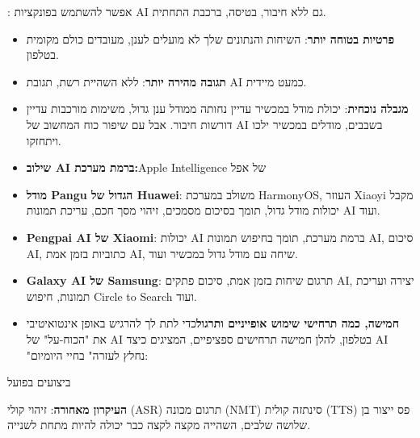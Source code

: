 
: אפשר להשתמש בפונקציות AI גם ללא חיבור, בטיסה, ברכבת התחתית.

\begin{itemize}
  \item \textbf{פרטיות בטוחה יותר}: השיחות והנתונים שלך לא מועלים לענן, מעובדים כולם מקומית בטלפון.
  \item \textbf{תגובה מהירה יותר}: ללא השהיית רשת, תגובת AI כמעט מיידית.
  \item \textbf{מגבלה נוכחית}: יכולת מודל במכשיר עדיין נחותה ממודל ענן גדול, משימות מורכבות עדיין דורשות חיבור. אבל עם שיפור כוח המחשוב של AI בשבבים, מודלים במכשיר ילכו ויתחזקו.
  \item \textbf{שילוב AI ברמת מערכת:}Apple Intelligence של אפל
\end{itemize}


\begin{itemize}
  \item \textbf{מודל Pangu הגדול של Huawei}: משולב במערכת HarmonyOS, העוזר Xiaoyi מקבל יכולות מודל גדול, תומך בסיכום מסמכים, זיהוי מסך חכם, עריכת תמונות AI ועוד.
  \item \textbf{Pengpai AI של Xiaomi}: יכולות AI ברמת מערכת, תומך בחיפוש תמונות AI, סיכום AI, כתוביות בזמן אמת AI, שיחה עם מודל גדול במכשיר ועוד.
  \item \textbf{Galaxy AI של Samsung}: תרגום שיחות בזמן אמת, סיכום פתקים AI, יצירה ועריכת תמונות, חיפוש Circle to Search ועוד.
  \item \textbf{חמישה, כמה תרחישי שימוש אופייניים ותרגול}כדי לתת לך להרגיש באופן אינטואיטיבי את "הכוח-על" של AI בטלפון, להלן חמישה תרחישים ספציפיים, המציגים כיצד AI "נחלץ לעזרה" בחיי היומיום:
\end{itemize}


ביצועים בפועל


\textbf{העיקרון מאחורה}: זיהוי קולי (ASR) תרגום מכונה (NMT) סינתזה קולית (TTS) פס ייצור בן שלושה שלבים, השהייה מקצה לקצה כבר יכולה להיות מתחת לשנייה.

